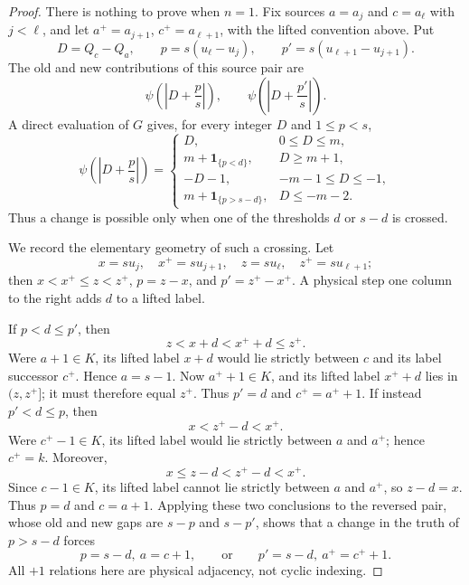 \documentclass[10pt]{article}
\newcommand{\ind}{\mathbf 1}
\begin{document}
\begin{proof}
There is nothing to prove when \(n=1\).  Fix sources
\(a=a_j\) and \(c=a_\ell\) with \(j<\ell\), and let
\(a^+=a_{j+1}\), \(c^+=a_{\ell+1}\), with the lifted convention above.
Put
\[
  D=Q_c-Q_a,
  \qquad
  p=s(u_\ell-u_j),
  \qquad
  p'=s(u_{\ell+1}-u_{j+1}).
\]
The old and new contributions of this source pair are
\[
  \psi\!\left(\left|D+\frac ps\right|\right),
  \qquad
  \psi\!\left(\left|D+\frac{p'}s\right|\right).
\]
A direct evaluation of \(G\) gives, for every integer \(D\) and
\(1\le p<s\),
\begin{equation}
\psi\!\left(\left|D+\frac ps\right|\right)
=
\begin{cases}
D, &0\le D\le m,\\[1mm]
m+\ind_{\{p<d\}}, &D\ge m+1,\\[1mm]
-D-1, &-m-1\le D\le-1,\\[1mm]
m+\ind_{\{p>s-d\}}, &D\le-m-2.
\end{cases}
\label{eq:psi-pair}
\end{equation}
Thus a change is possible only when one of the thresholds \(d\) or
\(s-d\) is crossed.

We record the elementary geometry of such a crossing.  Let
\[
  x=su_j,
  \quad x^+=su_{j+1},
  \quad z=su_\ell,
  \quad z^+=su_{\ell+1};
\]
then \(x<x^+\le z<z^+\), \(p=z-x\), and \(p'=z^+-x^+\).  A physical step
one column to the right adds \(d\) to a lifted label.

If \(p<d\le p'\), then
\[
  z<x+d<x^++d\le z^+.
\]
Were \(a+1\in K\), its lifted label \(x+d\) would lie strictly between
\(c\) and its label successor \(c^+\).  Hence \(a=s-1\).  Now
\(a^++1\in K\), and its lifted label \(x^++d\) lies in \((z,z^+]\); it
must therefore equal \(z^+\).  Thus \(p'=d\) and \(c^+=a^++1\).
If instead \(p'<d\le p\), then
\[
  x<z^+-d<x^+.
\]
Were \(c^+-1\in K\), its lifted label would lie strictly between \(a\) and
\(a^+\); hence \(c^+=k\).  Moreover,
\[
  x\le z-d<z^+-d<x^+.
\]
Since \(c-1\in K\), its lifted label cannot lie strictly between \(a\) and
\(a^+\), so \(z-d=x\).  Thus \(p=d\) and \(c=a+1\).  Applying these
two conclusions to the reversed pair, whose old and new gaps are
\(s-p\) and \(s-p'\), shows that a change in the truth of \(p>s-d\) forces
\begin{equation}
  p=s-d,\ a=c+1,
  \qquad\text{or}\qquad
  p'=s-d,\ a^+=c^++1.
  \label{eq:reverse-threshold}
\end{equation}
All \(+1\) relations here are physical adjacency, not cyclic indexing.


\end{proof}
\end{document}
